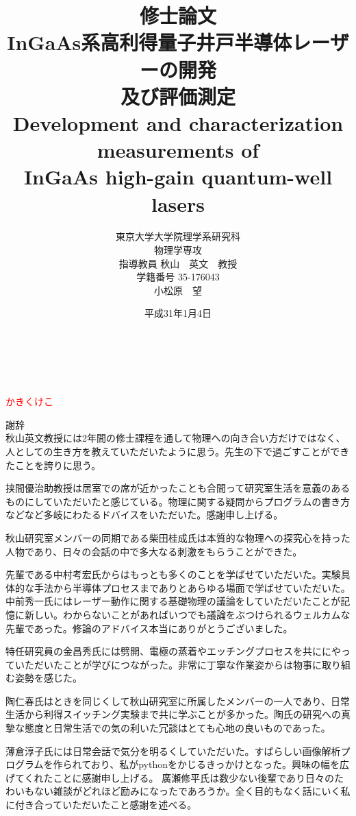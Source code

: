 \documentclass[11pt,dvipdfmx]{jreport}
\title{
{\LARGE 修士論文\\[1cm]}
{\huge InGaAs系高利得量子井戸半導体レーザーの開発\\及び評価測定\\[1cm]
Development and characterization measurements of \\InGaAs high-gain quantum-well
lasers\\[5cm]}
}
\date{\LARGE 平成31年1月4日}
\author{\LARGE 東京大学大学院理学系研究科\\
\LARGE 物理学専攻\\[1cm]
\LARGE 指導教員 秋山　英文　教授\\[1cm]
\LARGE 学籍番号 35-176043\\
\LARGE 小松原　望}
\newif\ifnoproofreadmark \noproofreadmarkfalse
\def\addspan#1{%
 \ifnoproofreadmark%
   #1%
 \else%
  \textcolor{red}{#1}%
 \fi%
}
\def\delspan#1{%
 \ifnoproofreadmark%
  \empty%
 \else%
  {\Midline{#1}}%
 \fi%
}
\begin{document}
\maketitle			%
\tableofcontents 	%
\listoffigures 		%
\listoftables　		%


\delspan{アイウエオ}\\
\addspan{かきくけこ}
謝辞\\
秋山英文教授には2年間の修士課程を通して物理への向き合い方だけではなく、人としての生き方を教えていただいたように思う。先生の下で過ごすことができたことを誇りに思う。


挟間優治助教授は居室での席が近かったことも合間って研究室生活を意義のあるものにしていただいたと感じている。物理に関する疑問からプログラムの書き方などなど多岐にわたるドバイスをいただいた。感謝申し上げる。


秋山研究室メンバーの同期である柴田桂成氏は本質的な物理への探究心を持った人物であり、日々の会話の中で多大なる刺激をもらうことができた。


先輩である中村考宏氏からはもっとも多くのことを学ばせていただいた。実験具体的な手法から半導体プロセスまでありとあらゆる場面で学ばせていただいた。中前秀一氏にはレーザー動作に関する基礎物理の議論をしていただいたことが記憶に新しい。わからないことがあればいつでも議論をぶつけられるウェルカムな先輩であった。修論のアドバイス本当にありがとうございました。


特任研究員の金昌秀氏には劈開、電極の蒸着やエッチングプロセスを共ににやっていただいたことが学びにつながった。非常に丁寧な作業姿からは物事に取り組む姿勢を感じた。

陶仁春氏はときを同じくして秋山研究室に所属したメンバーの一人であり、日常生活から利得スイッチング実験まで共に学ぶことが多かった。陶氏の研究への真摯な態度と日常生活での気の利いた冗談はとても心地の良いものであった。


薄倉淳子氏には日常会話で気分を明るくしていただいた。すばらしい画像解析プログラムを作られており、私がpythonをかじるきっかけとなった。興味の幅を広げてくれたことに感謝申し上げる。
廣瀬修平氏は数少ない後輩であり日々のたわいもない雑談がどれほど励みになったであろうか。全く目的もなく話にいく私に付き合っていただいたこと感謝を述べる。
\end{document}
